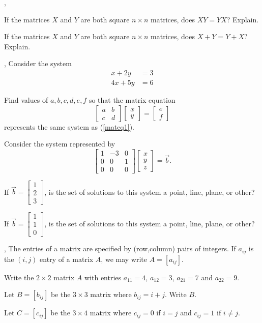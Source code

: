 \documentclass[letter]{article}
\newcommand{\mat}[1]{\begin{bmatrix}#1\end{bmatrix}}
\begin{document}
	\sep
	\vspace{-.8cm}
	\begin{Enum}
		\item If the matrices $X$ and $Y$ are both square $n\times n$ matrices,
		does $XY=YX$?  Explain.
		\item If the matrices $X$ and $Y$ are both square $n\times n$ matrices,
		does $X+Y=Y+X$?  Explain.
	\end{Enum}

	\sep
	Consider the system
	\begin{equation}\label{mateq1}
		\begin{array}{ll}
			x+2y &= 3\\
			4x+5y &= 6
		\end{array}
	\end{equation}

	\begin{Enum}
		\item Find values of $a,b,c,d,e,f$ so that the matrix equation
		\[
			\mat{a&b\\c&d}\mat{x\\y}=\mat{e\\f}
		\]
		represents the same system as (\ref{mateq1}).
	\end{Enum}

	Consider the system represented by
	\[
		\mat{1&-3&0\\0&0&1\\0&0&0}\mat{x\\y\\z}=\vec b.
	\]
	\begin{Enum}[resume]
		\item If $\vec b=\mat{1\\2\\3}$, is the set of solutions to this system a 
		point, line, plane, or other?
		\item If $\vec b=\mat{1\\1\\0}$, is the set of solutions to this system a 
		point, line, plane, or other?
	\end{Enum}

	\sep
	The entries of a matrix are specified by (row,column) pairs of integers.  If
	$a_{ij}$ is the $(i,j)$ entry of a matrix $A$, we may write $A=[a_{ij}]$.
	\begin{Enum}
		\item Write the $2\times 2$ matrix $A$ with entries $a_{11} = 4$, $a_{12}=3$,
			$a_{21} = 7$ and $a_{22}=9$.
		\item Let $B=[b_{ij}]$ be the $3\times 3$ matrix where $b_{ij} = i+j$.  Write $B$.
		\item Let $C=[c_{ij}]$ be the $3\times 4$ matrix where $c_{ij} = 0$ if $i=j$ and
			$c_{ij}=1$ if $i\neq j$.
	\end{Enum}
\end{document}
